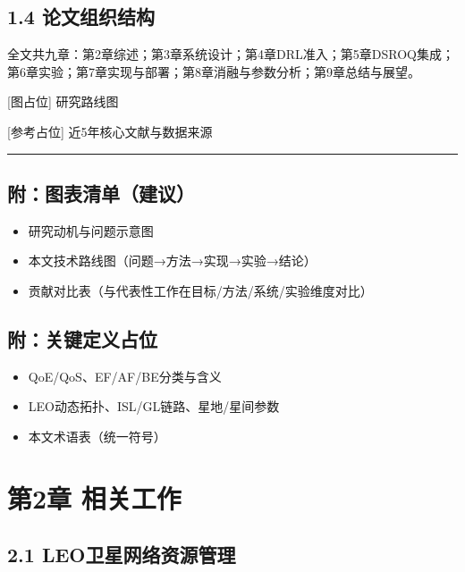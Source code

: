 \subsection{1.4
论文组织结构}\label{ux8bbaux6587ux7ec4ux7ec7ux7ed3ux6784}

全文共九章：第2章综述；第3章系统设计；第4章DRL准入；第5章DSROQ集成；第6章实验；第7章实现与部署；第8章消融与参数分析；第9章总结与展望。

{[}图占位{]} 研究路线图

{[}参考占位{]} 近5年核心文献与数据来源

\begin{center}\rule{0.5\linewidth}{0.5pt}\end{center}

\subsection{附：图表清单（建议）}\label{ux9644ux56feux8868ux6e05ux5355ux5efaux8bae}

\begin{itemize}
\tightlist
\item
  研究动机与问题示意图
\item
  本文技术路线图（问题→方法→实现→实验→结论）
\item
  贡献对比表（与代表性工作在目标/方法/系统/实验维度对比）
\end{itemize}

\subsection{附：关键定义占位}\label{ux9644ux5173ux952eux5b9aux4e49ux5360ux4f4d}

\begin{itemize}
\tightlist
\item
  QoE/QoS、EF/AF/BE分类与含义
\item
  LEO动态拓扑、ISL/GL链路、星地/星间参数
\item
  本文术语表（统一符号）
\end{itemize}

\section{第2章 相关工作}\label{ux7b2c2ux7ae0-ux76f8ux5173ux5de5ux4f5c}

\subsection{2.1
LEO卫星网络资源管理}\label{leoux536bux661fux7f51ux7edcux8d44ux6e90ux7ba1ux7406}

